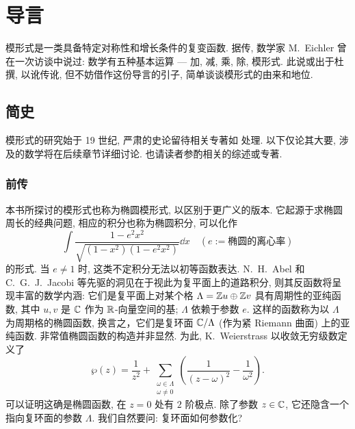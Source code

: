 
\chapter*{导言}
模形式是一类具备特定对称性和增长条件的复变函数. 据传, 数学家 M.\ Eichler 曾在一次访谈中说过: 数学有五种基本运算 --- 加, 减, 乘, 除, 模形式. 此说或出于杜撰, 以讹传讹, 但不妨借作这份导言的引子, 简单谈谈模形式的由来和地位.

\section*{简史}
模形式的研究始于 19 世纪, 严肃的史论留待相关专著如 \cite{Ro17} 处理. 以下仅论其大要, 涉及的数学将在后续章节详细讨论. 也请读者参酌相关的综述或专著.

\subsection*{前传}
本书所探讨的模形式也称为椭圆模形式, 以区别于更广义的版本. 它起源于求椭圆周长的经典问题, 相应的积分也称为椭圆积分, 可以化作
\[ \int \frac{1 - e^2 x^2}{\sqrt{(1 - x^2)(1 - e^2 x^2)}} \dd x \quad (e := \text{椭圆的离心率}) \]
的形式. 当 $e \neq 1$ 时, 这类不定积分无法以初等函数表达. N.\ H.\ Abel 和 C.\ G.\ J.\ Jacobi 等先驱的洞见在于视此为复平面上的道路积分, 则其反函数将呈现丰富的数学内涵: 它们是复平面上对某个格 $\Lambda = \mathbb{Z} u \oplus \mathbb{Z} v$ 具有周期性的亚纯函数, 其中 $u, v$ 是 $\mathbb{C}$ 作为 $\mathbb{R}$-向量空间的基; $\Lambda$ 依赖于参数 $e$. 这样的函数称为以 $\Lambda$ 为周期格的椭圆函数, 换言之，它们是复环面 $\mathbb{C}/\Lambda$ (作为紧 Riemann 曲面) 上的亚纯函数. 非常值椭圆函数的构造并非显然. 为此, K.\ Weierstrass 以收敛无穷级数定义了
\[ \wp(z) = \dfrac{1}{z^2} + \sum_{\substack{\omega \in \Lambda \\ \omega \neq 0}} \left( \dfrac{1}{(z - \omega)^2} - \dfrac{1}{\omega^2} \right). \]
可以证明这确是椭圆函数, 在 $z=0$ 处有 $2$ 阶极点. 除了参数 $z \in \mathbb{C}$, 它还隐含一个指向复环面的参数 $\Lambda$. 我们自然要问: 复环面如何参数化?

